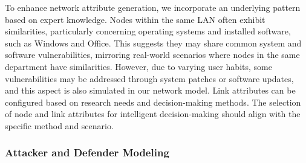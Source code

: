 To enhance network attribute generation, we incorporate an underlying pattern based on expert knowledge. Nodes within the same LAN often exhibit similarities, particularly concerning operating systems and installed software, such as Windows and Office. This suggests they may share common system and software vulnerabilities, mirroring real-world scenarios where nodes in the same department have similarities. However, due to varying user habits, some vulnerabilities may be addressed through system patches or software updates, and this aspect is also simulated in our network model.
Link attributes can be configured based on research needs and decision-making methods. The selection of node and link attributes for intelligent decision-making should align with the specific method and scenario.


\subsubsection{Attacker and Defender Modeling}



